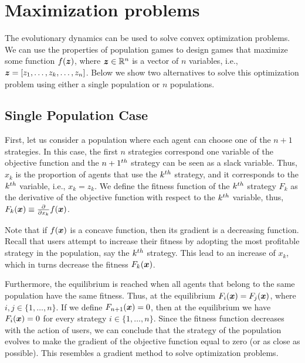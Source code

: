 
 \FloatBarrier

\section{Maximization problems}\label{sec:maximization}




The evolutionary dynamics can be used to solve convex optimization problems. 
We can use the properties of population games to design games that maximize some function $f(\boldsymbol{z})$, where $\boldsymbol{z}\in\mathbb{R}^{n}$ is a vector of $n$ variables, i.e., $\boldsymbol{z} = [z_1, \ldots, z_k, \ldots, z_n]$. Below we show two alternatives to solve this optimization problem using either a single population or $n$ populations.



\subsection{Single Population Case}

First, let us consider a population where each agent can choose one of the $n+1$ strategies. In this case, the first $n$ strategies correspond one variable of the objective function and the $n+1^{th}$ strategy can be seen as a slack variable. 
Thus, $x_k$ is the proportion of agents that use the $k^{th}$ strategy, and it corresponds to the $k^{th}$ variable, i.e., $x_k = z_k$.
We define the fitness function of the $k^{th}$ strategy $F_k$ as the derivative of the objective function with respect to the $k^{th}$ variable, thus, $F_k(\boldsymbol{x}) \equiv \frac{\partial }{\partial x_k} f(\boldsymbol{x})$.

Note that if $f(\boldsymbol{x})$ is a concave function, then its gradient is a decreasing function. 
Recall that users attempt to increase their fitness by adopting the most profitable strategy in the population, say the $k^{th}$ strategy. This lead to an increase of $x_k$, which in turns decrease the fitness  $F_k(\boldsymbol{x})$. 

Furthermore, the equilibrium is reached when all agents that belong to the same population have the same fitness.
Thus, at the equilibrium $F_i(\boldsymbol{x}) = F_j(\boldsymbol{x})$, where $i,j\in\{1, \ldots, n \}$.
If we define $F_{n+1}(\boldsymbol{x}) = 0$, then at the equilibrium we have $F_i(\boldsymbol{x}) = 0$  for every strategy $i\in\{1, \ldots, n\}$. 
%
Since the fitness function decreases with the action of users, we can conclude that the strategy of the population evolves to make the gradient of the objective function equal to zero (or as close as possible). This resembles a gradient method to solve optimization problems.

